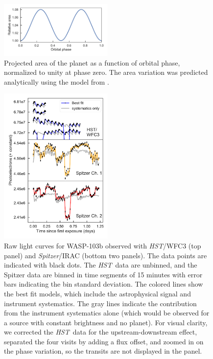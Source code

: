 \documentclass[twocolumn]{aastex61}
\newcommand{\project}[1]{\textsl{#1}}
\newcommand{\HST}{\project{HST}}
\newcommand{\Spitzer}{\project{Spitzer}}
\begin{document}
\begin{figure}
\includegraphics[width = 0.5\textwidth]{Figures/ellipsoidal.pdf}
\caption{Projected area of the planet as a function of orbital phase, normalized to unity at phase zero. The area variation was predicted analytically using the model from \cite{leconte11b}.}
\label{fig:ellipsoidal}
\end{figure}

\begin{figure}
\includegraphics[width = 0.5\textwidth]{Figures/systematics.pdf}
\caption{Raw light curves for WASP-103b observed with \HST/WFC3 (top panel) and \Spitzer/IRAC (bottom two panels). The data points are indicated with black dots. The \HST\ data are unbinned, and the Spitzer data are binned in time segments of 15 minutes with error bars indicating the bin standard deviation. The colored lines show the best fit models, which include the astrophysical signal and instrument systematics. The gray lines indicate the contribution from the instrument systematics alone (which would be observed for a source with constant brightness and no planet). For visual clarity, we corrected the \HST\ data for the upstream-downstream effect, separated the four visits by adding a flux offset, and zoomed in on the phase variation, so the transits are not displayed in the panel.}
\label{fig:systematics}
\end{figure}
\end{document}
